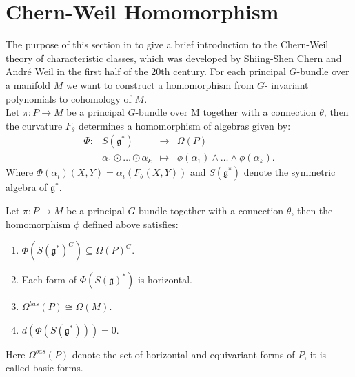 \section{Chern-Weil Homomorphism}
The purpose of this section in to give a brief introduction to the Chern-Weil theory of characteristic classes, which was developed by Shiing-Shen Chern and André Weil  in the first half of the 20th century. For each principal $G$-bundle over a manifold $M$ we want to construct a homomorphism from $G$- invariant polynomials to cohomology of $M$.\\
Let $\pi: P \to M$ be a principal $G$-bundle over M together with a connection $\theta$, then the curvature $F_{\theta}$ determines a homomorphism of algebras given by:
 $$\begin{array}{crcl}
\Phi :& S(\mathfrak{g}^{*}) \quad & \longrightarrow & \Omega(P) \\
& \alpha_{1} \odot \dots \odot \alpha_{k} & \mapsto & \phi(\alpha_{1}) \wedge \dots \wedge \phi(\alpha_{k}).
\end{array}$$
Where $\Phi(\alpha_{i})(X,Y)=\alpha_{i}(F_{\theta}(X,Y))$ and $S(\mathfrak{g}^{*}) $ denote the symmetric algebra of $\mathfrak{g}^{*}$.

\begin{theorem}
	Let $\pi: P \to M$ be a principal $G$-bundle together with a connection $\theta$, then the homomorphism $\phi$ defined above satisfies:
	\begin{enumerate}
	\item $\Phi(S(\mathfrak{g}^{*})^{G}) \subseteq \Omega(P)^{G}$.
	\item Each form of  $\Phi(S(\mathfrak{g})^{*})$ is horizontal.
	\item $\Omega^{bas}(P) \cong \Omega(M)$.
	\item $d(\Phi(S(\mathfrak{g}^{*})))=0$. 
	\end{enumerate}
Here $\Omega^{bas}(P)$ denote the set of horizontal and equivariant forms of $P$, it is called basic forms.
\end{theorem}



